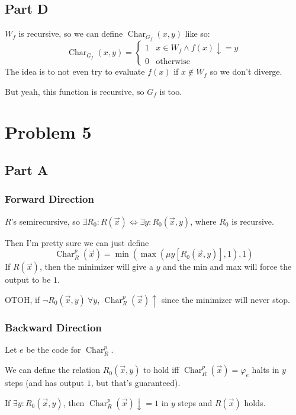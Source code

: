 \documentclass[12pt]{article}
\DeclareMathOperator{\ch}{Char}
\begin{document}
\subsection{Part D}

$W_f$ is recursive, so we can define $\ch_{G_f}(x, y)$ like so:
\[\ch_{G_f}(x, y)=\begin{cases}
    1 & x \in W_f \land f(x)\downarrow = y \\
    0 & \text{otherwise}
  \end{cases}\]
The idea is to not even try to evaluate $f(x)$ if $x \notin W_f$ so we don't diverge.

But yeah, this function is recursive, so $G_f$ is too.

\pagebreak

\section{Problem 5}

\subsection{Part A}

\subsubsection{Forward Direction}

$R$'s semirecursive, so $\exists R_0: R(\vec{x}) \iff \exists y: R_0(\vec{x}, y)$, where $R_0$ is recursive.

Then I'm pretty sure we can just define
\[\ch_R^p(\vec{x})=\min(\max(\mu y[R_0(\vec{x}, y)], 1), 1)\]
If $R(\vec{x})$, then the minimizer will give a $y$ and the min and max will force the output to be $1$.

OTOH, if $\lnot R_0(\vec{x}, y)\ \forall y$, $\ch_R^p(\vec{x})\uparrow$ since the minimizer will never stop.

\subsubsection{Backward Direction}

Let $e$ be the code for $\ch_R^p$.

We can define the relation $R_0(\vec{x}, y)$ to hold iff
$\ch_R^p(\vec{x})=\varphi_e$ halts in $y$ steps (and has output $1$, but that's guaranteed).

If $\exists y: R_0(\vec{x}, y)$, then $\ch_R^p(\vec{x})\downarrow = 1$ in $y$ steps and $R(\vec{x})$ holds.
\end{document}
